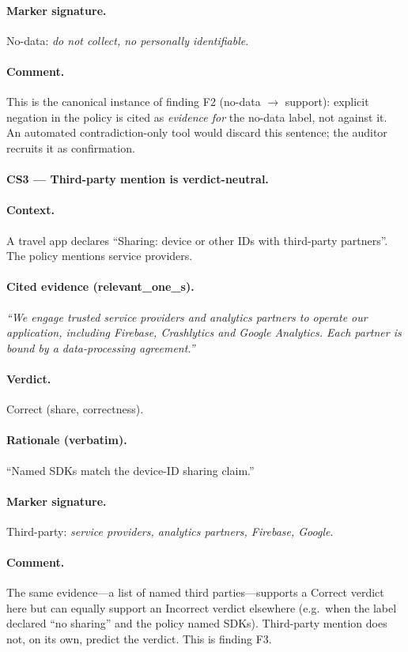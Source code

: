 \documentclass[11pt,a4paper]{article}
\newcommand{\dec}[1]{\textsf{#1}}
\begin{document}
\paragraph{Marker signature.}
\dec{No-data}: \emph{do not collect, no personally identifiable}.
\paragraph{Comment.} This is the canonical instance of finding F2
(no-data $\to$ support): explicit negation in the policy is cited as
\emph{evidence for} the no-data label, not against it. An automated
contradiction-only tool would discard this sentence; the auditor
recruits it as confirmation.

\paragraph{CS3 --- Third-party mention is verdict-neutral.}
\paragraph{Context.}
A travel app declares ``Sharing: device or other IDs with third-party
partners''. The policy mentions service providers.
\paragraph{Cited evidence (relevant\_one\_s).}
\textit{``We engage trusted service providers and analytics partners
to operate our application, including Firebase, Crashlytics and
Google Analytics. Each partner is bound by a data-processing
agreement.''}
\paragraph{Verdict.} Correct (share, correctness).
\paragraph{Rationale (verbatim).} ``Named SDKs match the device-ID
sharing claim.''
\paragraph{Marker signature.}
\dec{Third-party}: \emph{service providers, analytics partners,
Firebase, Google}.
\paragraph{Comment.} The same evidence---a list of named third
parties---supports a Correct verdict here but can equally support an
Incorrect verdict elsewhere (e.g.\ when the label declared ``no
sharing'' and the policy named SDKs). Third-party mention does not, on
its own, predict the verdict. This is finding F3.
\end{document}
